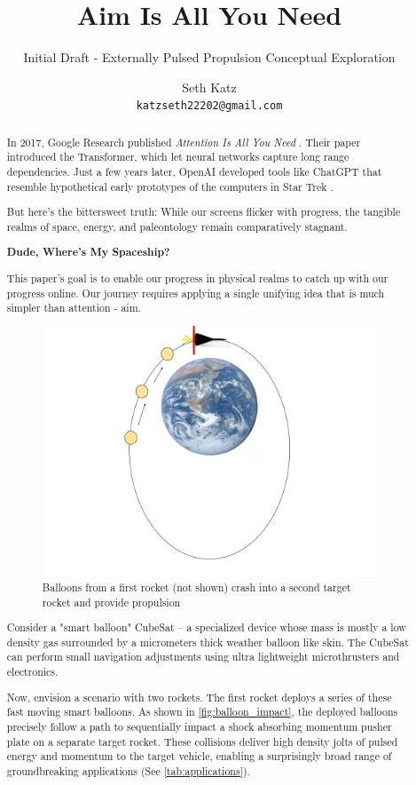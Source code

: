 \documentclass{article}
\title{Aim Is All You Need}
\subtitle{Initial Draft - Externally Pulsed Propulsion Conceptual Exploration}
\author{
  Seth Katz \\
  \texttt{katzseth22202@gmail.com} \\
}
\begin{document}
\maketitle

\newpage
\tableofcontents
\newpage

\begin{abstract}\label{sec:abstract}
 
In 2017, Google Research published \textit{Attention Is All You Need} \cite{vaswani2023attentionneed}.  Their paper introduced the Transformer, which let neural networks capture long range dependencies.   Just a few years later, OpenAI developed tools like ChatGPT \cite{chatgpt} that resemble hypothetical early prototypes of the computers in Star Trek \cite{startrek}.

But here's the bittersweet truth:  While our screens flicker with progress, the tangible realms of space, energy, and paleontology remain comparatively stagnant.

\textbf{Dude, Where's My Spaceship?}

This paper's goal is to enable our progress in physical realms to catch up with our progress online.  Our journey requires applying a single unifying idea that is much simpler than attention - aim.   

\begin{figure}[htpb]
    \centering
    \includegraphics[width=0.5\linewidth]{images/Starship_Impact_ellipse.png}
    \caption{Balloons from a first rocket (not shown) crash into a second target rocket and provide propulsion \cite{earth_image}}
    \label{fig:balloon_impact}
\end{figure}

Consider a "smart balloon" CubeSat -- a specialized device whose mass is mostly a low density gas surrounded by a micrometers thick weather balloon like skin. The CubeSat can perform small navigation adjustments using ultra lightweight microthrusters and electronics.

Now, envision a scenario with two rockets. The first rocket deploys a series of these fast moving smart balloons. As shown in \autoref{fig:balloon_impact}, the deployed balloons precisely follow a path to sequentially impact a shock absorbing momentum pusher plate on a separate target rocket. These collisions deliver high density jolts of pulsed energy and momentum to the target vehicle, enabling a surprisingly broad range of groundbreaking applications (See \autoref{tab:applications}). 


\end{abstract}
\end{document}
